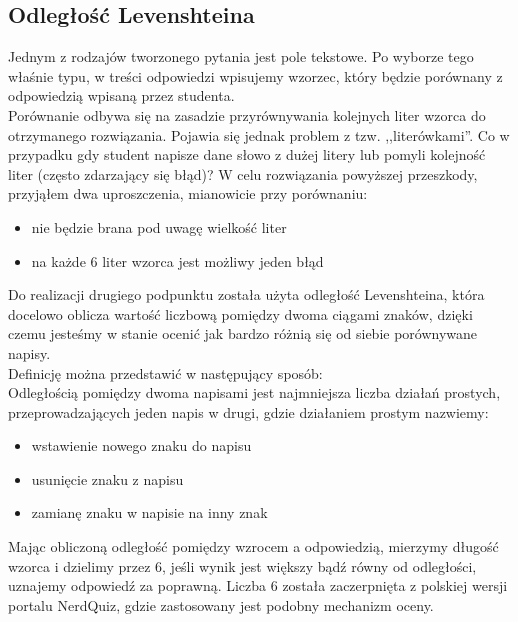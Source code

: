 \documentclass[a4paper,12pt]{article}
\begin{document}
\subsection{Odległość Levenshteina}
Jednym z rodzajów tworzonego pytania jest pole tekstowe. Po wyborze tego właśnie typu, w
treści odpowiedzi wpisujemy wzorzec, który będzie porównany z odpowiedzią wpisaną przez
studenta.\\
Porównanie odbywa się na zasadzie przyrównywania kolejnych liter wzorca do otrzymanego
rozwiązania. Pojawia się jednak problem z tzw. ,,literówkami''. Co w przypadku gdy student
napisze dane słowo z dużej litery lub pomyli kolejność liter (często zdarzający się błąd)?
W celu rozwiązania powyższej przeszkody, przyjąłem dwa uproszczenia, mianowicie przy
porównaniu:
\begin{itemize}
  \item nie będzie brana pod uwagę wielkość liter
  \item na każde 6 liter wzorca jest możliwy jeden błąd
\end{itemize}
Do realizacji drugiego podpunktu została użyta odległość Levenshteina, która docelowo
oblicza wartość liczbową pomiędzy dwoma ciągami znaków, dzięki czemu jesteśmy w stanie
ocenić jak bardzo różnią się od siebie porównywane napisy.\\
Definicję można przedstawić w następujący sposób: \cite{levenshtein}\\
Odległością pomiędzy dwoma napisami jest najmniejsza liczba działań prostych,
przeprowadzających jeden napis w drugi, gdzie działaniem prostym nazwiemy:
\begin{itemize}
  \item wstawienie nowego znaku do napisu
  \item usunięcie znaku z napisu
  \item zamianę znaku w napisie na inny znak
\end{itemize}
Mając obliczoną odległość pomiędzy wzrocem a odpowiedzią, mierzymy długość wzorca i
dzielimy przez 6, jeśli wynik jest większy bądź równy od odległości, uznajemy odpowiedź
za poprawną. Liczba 6 została zaczerpnięta z polskiej wersji portalu NerdQuiz, gdzie
zastosowany jest podobny mechanizm oceny.

\clearpage


\end{document}
